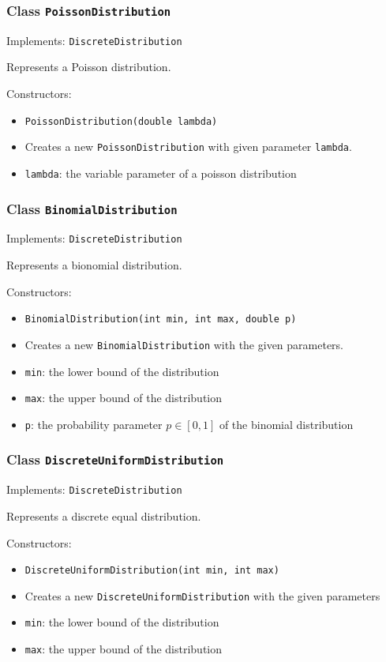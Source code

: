 \documentclass[parskip=full,11pt]{scrartcl}
\begin{document}
\subsubsection{Class \texttt{PoissonDistribution}}
Implements: \texttt{DiscreteDistribution}

Represents a Poisson distribution.

Constructors:
\begin{itemize}\itemsep -10pt
\item \texttt{PoissonDistribution(double lambda)}
\item[] Creates a new \texttt{PoissonDistribution} with given parameter \texttt{lambda}.
\item[] \texttt{lambda}: the variable parameter of a poisson distribution
\end{itemize}

\subsubsection{Class \texttt{BinomialDistribution}}
Implements: \texttt{DiscreteDistribution}

Represents a bionomial distribution.

Constructors:
\begin{itemize}\itemsep -10pt
\item \texttt{BinomialDistribution(int min, int max, double p)}
\item[] Creates a new \texttt{BinomialDistribution} with the given parameters.
\item[] \texttt{min}: the lower bound of the distribution
\item[] \texttt{max}: the upper bound of the distribution
\item[] \texttt{p}: the probability parameter \(p \in [0,1]\) of the binomial distribution
\end{itemize}

\subsubsection{Class \texttt{DiscreteUniformDistribution}}
Implements: \texttt{DiscreteDistribution}

Represents a discrete equal distribution.

Constructors:
\begin{itemize}\itemsep -10pt
\item \texttt{DiscreteUniformDistribution(int min, int max)}
\item[] Creates a new \texttt{DiscreteUniformDistribution} with the given parameters
\item[] \texttt{min}: the lower bound of the distribution
\item[] \texttt{max}: the upper bound of the distribution
\end{itemize}
\end{document}
